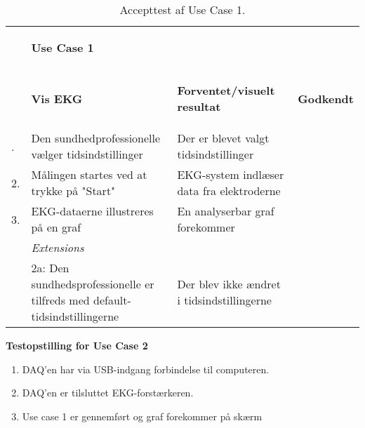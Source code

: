 \begin{table}[H]
    \begin{tabularx}{\textwidth}{l X X c}
     \toprule
     ~ & \begin{large}\textbf{Use Case 1} \end{large} & ~ & ~ \\  
     ~ & \begin{large}\textbf{Vis EKG} \end{large}	  
     & \begin{large} \textbf{Forventet/visuelt resultat}\end{large} 
     & \begin{large} \textbf{Godkendt} \end{large}      
     \\     	 \midrule \addlinespace[3mm]                                                                                                                                                                             					    
                         1. &  Den sundhedprofessionelle vælger tidsindstillinger
     					    &  Der er blevet valgt tidsindstillinger 
     					    &  %
     					    \\ \midrule  
     					 2. &  Målingen startes ved at trykke på "Start"
     					    &  EKG-system indlæser data fra elektroderne
     					    &  %
     					    \\ \midrule
     					 3. &  EKG-dataerne illustreres på en graf 
     					    &  En analyserbar graf forekommer
     					    &  %
     					    \\ \midrule   
                         ~  &  \textit{Extensions}
     					    &  ~  
     					    &  ~         \\	\midrule
                         ~  &  2a: Den sundhedsprofessionelle er tilfreds med default-tidsindstillingerne
     					    &  Der blev ikke ændret i tidsindstillingerne 
     					    &  %
     					    \\
    					         					         	
	\bottomrule   
    \end{tabularx}
    \caption {Accepttest af Use Case 1.}
    \label{tab:AT_UC1}
\end{table}


\textbf{Testopstilling for Use Case 2}
\begin{enumerate}
	\item DAQ’en har via USB-indgang forbindelse til computeren.
	\item DAQ’en er tilsluttet EKG-forstærkeren.
	\item Use case 1 er gennemført og graf forekommer på skærm
\end{enumerate}

